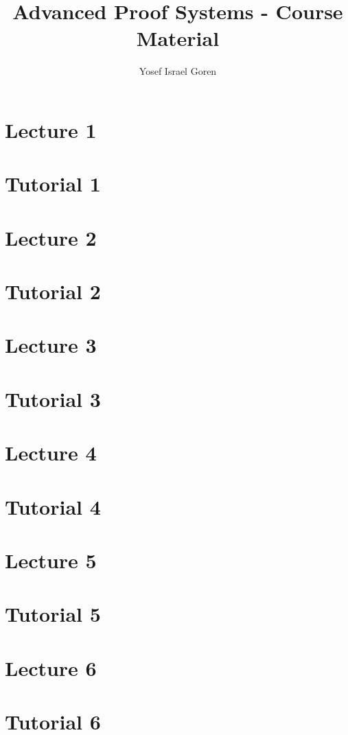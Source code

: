 \documentclass{article}
\title{Advanced Proof Systems - Course Material}
\author{Yosef Israel Goren}
\begin{document}
\maketitle

\part*{Lecture 1}

\part*{Tutorial 1}

\part*{Lecture 2}

\part*{Tutorial 2}

\part*{Lecture 3}

\part*{Tutorial 3}

\part*{Lecture 4}

\part*{Tutorial 4}

\part*{Lecture 5}

\part*{Tutorial 5}

\part*{Lecture 6}

\part*{Tutorial 6}

\end{document}

